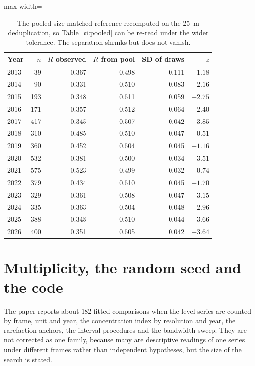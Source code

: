 \documentclass[fleqn,10pt]{wlpeerj}
\begin{document}
\begin{table}[H]
\centering
\caption{The pooled size-matched reference recomputed on the \SI{25}{\meter} deduplication, so
Table~\ref{si:pooled} can be re-read under the wider tolerance. The separation shrinks but does
not vanish.}
\label{si:ndpooled}
\small
\begin{adjustbox}{max width=\linewidth}
\begin{tabular}{lrrrrr}
\toprule
Year & $n$ & $R$ observed & $R$ from pool & SD of draws & $z$ \\
\midrule
2013 & 39 & 0.367 & 0.498 & 0.111 & $-1.18$ \\
2014 & 90 & 0.331 & 0.510 & 0.083 & $-2.16$ \\
2015 & 193 & 0.348 & 0.511 & 0.059 & $-2.75$ \\
2016 & 171 & 0.357 & 0.512 & 0.064 & $-2.40$ \\
2017 & 417 & 0.345 & 0.507 & 0.042 & $-3.85$ \\
2018 & 310 & 0.485 & 0.510 & 0.047 & $-0.51$ \\
2019 & 360 & 0.452 & 0.504 & 0.045 & $-1.16$ \\
2020 & 532 & 0.381 & 0.500 & 0.034 & $-3.51$ \\
2021 & 575 & 0.523 & 0.499 & 0.032 & $+0.74$ \\
2022 & 379 & 0.434 & 0.510 & 0.045 & $-1.70$ \\
2023 & 329 & 0.361 & 0.508 & 0.047 & $-3.15$ \\
2024 & 335 & 0.363 & 0.504 & 0.048 & $-2.96$ \\
2025 & 388 & 0.348 & 0.510 & 0.044 & $-3.66$ \\
2026 & 400 & 0.351 & 0.505 & 0.042 & $-3.64$ \\
\bottomrule
\end{tabular}
\end{adjustbox}
\end{table}

\section{Multiplicity, the random seed and the code}
\label{si:mult}
The paper reports about 182 fitted comparisons when the level series are counted by frame,
unit and year, the concentration index by resolution and year, the rarefaction anchors, the
interval procedures and the bandwidth sweep. They are not corrected as one family, because many
are descriptive readings of one series under different frames rather than independent
hypotheses, but the size of the search is stated.
\end{document}
